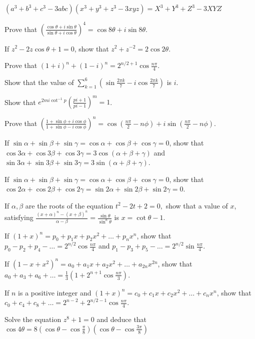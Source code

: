   \item $(a^3 + b^3 + c^3 - 3abc)(x^3 + y^3 + z^3 - 3xyz) = X^3 + Y^3 + Z^3 - 3XYZ$
  \stopitemize
\item Prove that $\left(\frac{\cos\theta + i\sin\theta}{\sin\theta + i\cos\theta}\right)^4 = \cos8\theta + i\sin8\theta$.
\item If $z^2 - 2z\cos\theta + 1 = 0$, show that $z^2 + z^{-2} = 2\cos2\theta$.
\item Prove that $(1 + i)^n + (1 - i)^n = 2^{n/2 + 1}\cos\frac{n\pi}{4}$.
\item Show that the value of $\displaystyle\sum_{k = 1}^6\left(\sin\frac{2\pi k}{7} - i\cos\frac{2\pi
  k}{7}\right)$ is $i$.
\item Show that $e^{2mi\cot^{-1}p}\left(\frac{pi + 1}{pi - 1}\right)^m = 1$.
\item Prove that $\left(\frac{1 + \sin\phi + i\cos\phi}{1 + \sin\phi - i\cos\phi}\right)^n = \cos\left(\frac{n\pi}{2} -
  n\phi\right) + i\sin\left(\frac{n\pi}{2} - n\phi\right)$.
\item If $\sin\alpha + \sin\beta + \sin\gamma = \cos\alpha + \cos\beta + \cos\gamma = 0$, show that $\cos3\alpha + \cos3\beta +
  \cos3\gamma = 3\cos(\alpha + \beta + \gamma)$ and $\sin3\alpha + \sin3\beta + \sin3\gamma = 3\sin(\alpha + \beta + \gamma)$.
\item If $\sin\alpha + \sin\beta + \sin\gamma = \cos\alpha + \cos\beta + \cos\gamma = 0$, show that $\cos2\alpha + \cos2\beta +
  \cos2\gamma = \sin2\alpha + \sin2\beta + \sin2\gamma = 0$.
\item If $\alpha, \beta$ are the roots of the equation $t^2 - 2t + 2 = 0,$ show that a value of $x$, satisfying $\frac{(x +
  \alpha)^n - (x + \beta)^n}{\alpha - \beta} = \frac{\sin\theta}{\sin^n\theta}$ is $x = \cot\theta - 1$.
\item If $(1 + x)^n = p_0 + p_1x + p_2x^2 + \ldots + p_nx^n$, show that $p_0 - p_2 + p_4 - \ldots = 2^{n/2}\cos\frac{n\pi}{4}$ and
  $p_1 - p_3 + p_5 - \ldots = 2^{n/2}\sin\frac{n\pi}{4}$.
\item If $(1 - x + x^2)^n = a_0 + a_1x + a_2x^2 + \ldots + a_{2n}x^{2n}$, show that $a_0 + a_3 + a_6 + \ldots = \frac{1}{3}\left(1
  + 2^{n + 1}\cos\frac{n\pi}{3}\right)$.
\item If $n$ is a positive integer and $(1 + x)^n = c_0 + c_1x + c_2x^2 + \ldots + c_nx^n$, show that $c_0 + c_4 + c_8 + \ldots =
  2^{n - 2} + 2^{n/2 - 1}\cos\frac{n\pi}{4}$.
\item Solve the equation $z^8 + 1= 0$ and deduce that $\cos4\theta = 8\left(\cos\theta - \cos\frac{\pi}{8}\right)\left(\cos\theta -
  \cos\frac{3\pi}{8}\right)$

